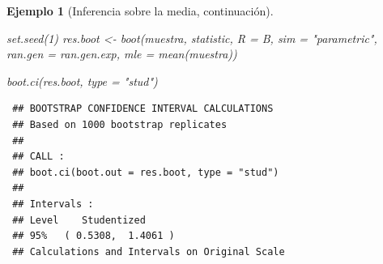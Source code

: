 \documentclass[
]{book}
\newenvironment{Shaded}{\begin{snugshade}}{\end{snugshade}}
\newcommand{\AttributeTok}[1]{\textcolor[rgb]{0.77,0.63,0.00}{#1}}
\newcommand{\DecValTok}[1]{\textcolor[rgb]{0.00,0.00,0.81}{#1}}
\newcommand{\FunctionTok}[1]{\textcolor[rgb]{0.00,0.00,0.00}{#1}}
\newcommand{\NormalTok}[1]{#1}
\newcommand{\OtherTok}[1]{\textcolor[rgb]{0.56,0.35,0.01}{#1}}
\newcommand{\StringTok}[1]{\textcolor[rgb]{0.31,0.60,0.02}{#1}}
\theoremstyle{break}
\newtheorem{example}{Ejemplo}[chapter]
\theoremstyle{nonumberplain}
\begin{document}
\begin{example}[Inferencia sobre la media, continuación]
\begin{Shaded}
\begin{Highlighting}[]
\FunctionTok{set.seed}\NormalTok{(}\DecValTok{1}\NormalTok{)}
\NormalTok{res.boot }\OtherTok{\textless{}{-}} \FunctionTok{boot}\NormalTok{(muestra, statistic, }\AttributeTok{R =}\NormalTok{ B, }\AttributeTok{sim =} \StringTok{"parametric"}\NormalTok{,}
                 \AttributeTok{ran.gen =}\NormalTok{ ran.gen.exp, }\AttributeTok{mle =} \FunctionTok{mean}\NormalTok{(muestra))}

\FunctionTok{boot.ci}\NormalTok{(res.boot, }\AttributeTok{type =} \StringTok{"stud"}\NormalTok{)}
\end{Highlighting}
\end{Shaded}

\begin{verbatim}
 ## BOOTSTRAP CONFIDENCE INTERVAL CALCULATIONS
 ## Based on 1000 bootstrap replicates
 ## 
 ## CALL : 
 ## boot.ci(boot.out = res.boot, type = "stud")
 ## 
 ## Intervals : 
 ## Level    Studentized     
 ## 95%   ( 0.5308,  1.4061 )  
 ## Calculations and Intervals on Original Scale
\end{verbatim}

\end{example}
\end{document}
